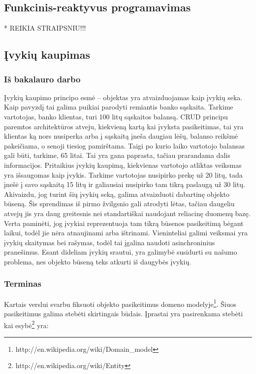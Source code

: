 \subsection{Funkcinis-reaktyvus programavimas}

	* REIKIA STRAIPSNIU!!!

\subsection{Įvykių kaupimas}

\subsubsection{Iš bakalauro darbo}

Įvykių kaupimo principo esmė – objektas yra atvaizduojamas kaip įvykių seka. Kaip pavyzdį tai galima puikiai parodyti remiantis banko sąskaita. Tarkime vartotojas, banko klientas, turi 100 litų sąskaitos balansą. CRUD principu paremtos architektūros atveju, kiekvieną kartą kai įvyksta pasikeitimas, tai yra klientas ką nors nusiperka arba į sąskaitą įneša daugiau lėšų, balanso reikšmė pakeičiama, o senoji tiesiog pamirštama. Taigi po kurio laiko vartotojo balansas gali būti, tarkime, 65 litai. Tai yra gana paprasta, tačiau prarandama dalis informacijos. Pritaikius įvykių kaupimą, kiekvienas vartotojo atliktas veiksmas yra išsaugomas kaip įvykis. Tarkime vartotojas nusipirko prekę už 20 litų, tada įnešė į savo sąskaitą 15 litų ir galiausiai nusipirko tam tikrą paslaugą už 30 litų. Akivaizdu, jog turint šių įvykių seką, galima atvaizduoti dabartinę objekto būseną.
Šis sprendimas iš pirmo žvilgsnio gali atrodyti lėtas, tačiau daugeliu atvejų jis yra daug greitesnis nei standartiškai naudojant reliacinę duomenų bazę. Verta paminėti, jog įvykiai reprezentuoja tam tikrą būsenos pasikeitimą bėgant laikui, todėl jie nėra atnaujinami arba ištrinami. Vieninteliai galimi veiksmai yra įvykių skaitymas bei rašymas, todėl tai įgalina naudoti asinchroninius pranešimus. Esant dideliam įvykių srautui, yra galimybė susidurti su našumo problema, nes objekto būseną teks atkurti iš daugybės įvykių.

\subsubsection{Terminas}

Kartais verslui svarbu fiksuoti objekto pasikeitimus domeno modelyje\footnote{http://en.wikipedia.org/wiki/Domain\_model}. Šiuos pasikeitimus galima stebėti skirtingais būdais. Įprastai yra pasirenkama stebėti kai esybė\footnote{http://en.wikipedia.org/wiki/Entity} yra:

